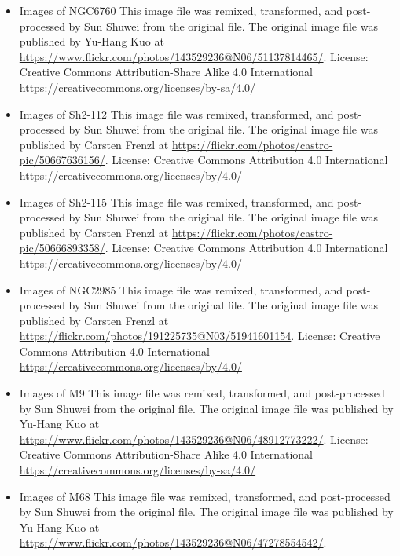 \begin{itemize}
	 This image file was remixed, transformed, and post-processed by Sun Shuwei from the original file. The original image file was published by Yu-Hang Kuo at \url{https://www.flickr.com/photos/143529236@N06/43257251884/}.
	 License: Creative Commons Attribution-Share Alike 4.0 International \url{https://creativecommons.org/licenses/by-sa/4.0/}
\item Images of NGC6760
	 This image file was remixed, transformed, and post-processed by Sun Shuwei from the original file. The original image file was published by Yu-Hang Kuo at \url{https://www.flickr.com/photos/143529236@N06/51137814465/}.
	 License: Creative Commons Attribution-Share Alike 4.0 International \url{https://creativecommons.org/licenses/by-sa/4.0/}
\item Images of Sh2-112
	 This image file was remixed, transformed, and post-processed by Sun Shuwei from the original file. The original image file was published by Carsten Frenzl at \url{https://flickr.com/photos/castro-pic/50667636156/}.
	 License: Creative Commons Attribution 4.0 International \url{https://creativecommons.org/licenses/by/4.0/}
\item Images of Sh2-115
	 This image file was remixed, transformed, and post-processed by Sun Shuwei from the original file. The original image file was published by Carsten Frenzl at \url{https://flickr.com/photos/castro-pic/50666893358/}.
	 License: Creative Commons Attribution 4.0 International \url{https://creativecommons.org/licenses/by/4.0/}
\item Images of NGC2985
	 This image file was remixed, transformed, and post-processed by Sun Shuwei from the original file. The original image file was published by Carsten Frenzl at \url{https://flickr.com/photos/191225735@N03/51941601154}.
	 License: Creative Commons Attribution 4.0 International \url{https://creativecommons.org/licenses/by/4.0/}
\item Images of M9
	 This image file was remixed, transformed, and post-processed by Sun Shuwei from the original file. The original image file was published by Yu-Hang Kuo at \url{https://www.flickr.com/photos/143529236@N06/48912773222/}.
	 License: Creative Commons Attribution-Share Alike 4.0 International \url{https://creativecommons.org/licenses/by-sa/4.0/}
\item Images of M68
	 This image file was remixed, transformed, and post-processed by Sun Shuwei from the original file. The original image file was published by Yu-Hang Kuo at \url{https://www.flickr.com/photos/143529236@N06/47278554542/}.

\end{itemize}
